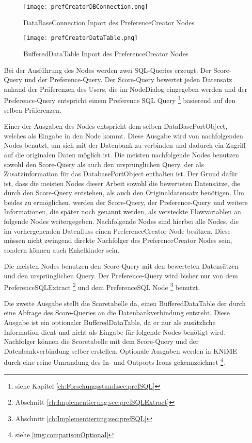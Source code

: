 \begin{figure}[H]
	\centering
	\texttt{[image: prefCreatorDBConnection.png]}
	\caption{DataBaseConnection Inport des PreferenceCreator Nodes}
	\label{img:prefCreatorDBConnection}
\end{figure}

\begin{figure}[H]
	\centering
	\texttt{[image: prefCreatorDataTable.png]}
	\caption{BufferedDataTable Inport des PreferenceCreator Nodes}
	\label{img:prefCreatorDataTable}
\end{figure}

Bei der Ausführung des Nodes werden zwei SQL-Queries erzeugt. Der Score-Query und der Preference-Query. Der Score-Query bewertet jeden Datensatz anhand der Präferenzen des Users, die im NodeDialog eingegeben werden und der Preference-Query entspricht einem Preference SQL Query \footnote{siehe Kapitel \ref{ch:Forschungsstand:sec:prefSQL}} basierend auf den selben Präferenzen. 

Einer der Ausgaben des Nodes entspricht dem selben DataBasePortObject, welches als Eingabe in den Node kommt. Diese Ausgabe wird von nachfolgenden Nodes benutzt, um sich mit der Datenbank zu verbinden und dadurch ein Zugriff auf die originalen Daten möglich ist. Die meisten nachfolgende Nodes benutzen sowohl den Score-Query als auch den ursprünglichen Query, der als  Zusatzinformation für das DatabasePortObject enthalten ist. Der Grund dafür ist, dass die meisten Nodes dieser Arbeit sowohl die bewerteten Datensätze, die durch den Score-Query entstehen, als auch den Originaldatensatz benötigen. Um beides zu ermöglichen, werden der Score-Query, der Preference-Query und weitere Informationen, die später noch genannt werden, als versteckte Flowvariablen an folgende Nodes weitergegeben. Nachfolgende Nodes sind hierbei alle Nodes, die im vorhergehenden Datenfluss einen PreferenceCreator Node besitzen. Diese müssen nicht zwingend direkte Nachfolger des PreferenceCreator Nodes sein, sondern können auch Enkelkinder sein.

Die meisten Nodes benutzen den Score-Query mit den bewerteten Datensätzen und den ursprünglichen Query. Der Preference-Query wird bisher nur von dem PreferenceSQLExtract \footnote{Abschnitt \ref{ch:Implementierung:sec:prefSQLExtract}} und dem PreferenceSQL Node \footnote{Abschnitt \ref{ch:Implementierung:sec:prefSQL}} benutzt. 

Die zweite Ausgabe stellt die Scoretabelle da, einen BufferedDataTable der durch eine Abfrage des Score-Queries an die Datenbankverbindung entsteht. Diese Ausgabe ist ein optionaler BufferedDataTable, da er nur als zusätzliche Information dient und nicht als Eingabe für folgende Nodes benötigt wird. Nachfolger können die Scoretabelle mit dem Score-Query und der Datenbankverbindung selber erstellen. Optionale Ausgaben werden in KNIME durch eine reine Umrandung des In- und Outports Icons gekennzeichnet \footnote{siehe \ref{img:comparisonOptional}}.

